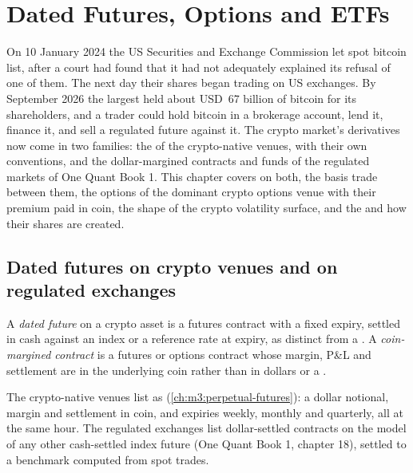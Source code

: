 \chapter{Dated Futures, Options and ETFs}\label{ch:m3:dated-futures-options-and-etfs}

On 10 January 2024 the US Securities and Exchange Commission let spot bitcoin 
list, after a court had found that it had not adequately explained its refusal of one of them. The next
day their shares began trading on US exchanges. By September 2026 the largest held about USD~67 billion
of bitcoin for its shareholders, and a trader could hold bitcoin in a brokerage account, lend it, finance
it, and sell a regulated future against it. The crypto market's derivatives now come in two families: the
 of the crypto-native venues, with their own conventions, and the dollar-margined
contracts and funds of the regulated markets of One Quant Book 1. This chapter covers  on
both, the basis trade between them, the options of the dominant crypto options venue with their premium
paid in coin, the shape of the crypto volatility surface, and the  and how their
shares are created.

\section{Dated futures on crypto venues and on regulated exchanges}

\begin{definition}\label{def:m3:dated-futures-options-and-etfs:dated}
A \emph{dated future} on a crypto asset is a futures contract with a fixed expiry,
settled in cash against an index or a reference rate at expiry, as distinct from a . A
\emph{coin-margined contract} is a futures or options contract whose margin,
P\&L and settlement are in the underlying coin rather than in dollars or a .
\end{definition}

The crypto-native venues list  as  (\cref{ch:m3:perpetual-futures}): a dollar
notional, margin and settlement in coin, and expiries weekly, monthly and quarterly, all at the same hour. The
regulated exchanges list dollar-settled contracts on the model of any other cash-settled index future (One
Quant Book 1, chapter 18), settled to a benchmark computed from spot trades.

